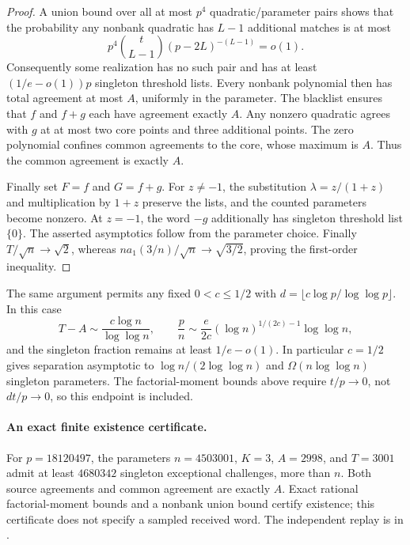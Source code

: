 \begin{proof}
A union bound over all at most $p^4$ quadratic/parameter pairs shows that
the probability any nonbank quadratic has $L-1$ additional matches is at most
\[
 p^4\binom{t}{L-1}(p-2L)^{-(L-1)}=o(1).
\]
Consequently some realization has no such pair and has at least
$(1/e-o(1))p$ singleton threshold lists. Every nonbank polynomial then
has total agreement at most $A$, uniformly in the parameter. The blacklist
ensures that $f$ and $f+g$ each have agreement exactly $A$.
Any nonzero quadratic agrees with $g$ at at most two core points and three
additional points. The zero polynomial confines common agreements to the
core, whose maximum is $A$. Thus the common agreement is exactly $A$.

Finally set $F=f$ and $G=f+g$.
For $z\ne-1$, the substitution $\lambda=z/(1+z)$ and multiplication
by $1+z$ preserve the lists, and the counted parameters become nonzero.
At $z=-1$, the word $-g$ additionally has singleton threshold list $\{0\}$.
The asserted asymptotics follow from the parameter choice.
Finally $T/\sqrt n\to\sqrt2$, whereas
$n a_1(3/n)/\sqrt n\to\sqrt{3/2}$, proving the first-order inequality.
\end{proof}

\begin{remark}
The same argument permits any fixed $0<c\le1/2$ with
$d=\lfloor c\log p/\log\log p\rfloor$. In this case
\[
 T-A\sim\frac{c\log n}{\log\log n},\qquad
 \frac pn\sim\frac{e}{2c}(\log n)^{1/(2c)-1}\log\log n,
\]
and the singleton fraction remains at least $1/e-o(1)$.
In particular $c=1/2$ gives separation asymptotic to
$\log n/(2\log\log n)$ and $\Omega(n\log\log n)$ singleton parameters.
The factorial-moment bounds above require $t/p\to0$, not $d t/p\to0$,
so this endpoint is included.
\end{remark}

\paragraph{An exact finite existence certificate.}
For $p=18120497$, the parameters $n=4503001$, $K=3$, $A=2998$,
and $T=3001$ admit at least $4680342$ singleton exceptional challenges,
more than $n$. Both source agreements and common agreement are exactly
$A$. Exact rational factorial-moment bounds and a nonbank union bound
certify existence; this certificate does not specify a sampled received
word. The independent replay is in
.

